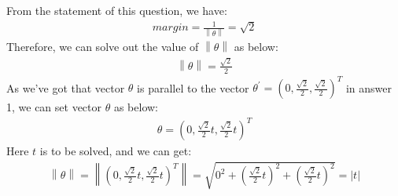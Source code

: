 \documentclass[paper=a4, fontsize=11pt]{scrartcl} %
\numberwithin{equation}{section} %
\numberwithin{figure}{section} %
\numberwithin{table}{section} %
\begin{document}
From the statement of this question, we have:
\begin{align*}
margin=\frac{1}{\left \| \theta  \right \|}=\sqrt{2}
\end{align*}
Therefore, we can solve out the value of $\left \| \theta  \right \|$ as below:
\begin{align*}
\left \| \theta  \right \|=\frac{\sqrt{2}}{2}
\end{align*}
As we've got that vector $\theta$ is parallel to the vector $\theta^{'} = \left(0, \frac{\sqrt{2}}{2}, \frac{\sqrt{2}}{2}\right)^{T}$ in answer 1, we can set vector $\theta$ as below:
\begin{align*}
\theta = \left(0, \frac{\sqrt{2}}{2}t, \frac{\sqrt{2}}{2}t\right)^{T}
\end{align*}
Here $t$ is to be solved, and we can get:
\begin{align*}
\left \| \theta \right \| = \left \| \left(0, \frac{\sqrt{2}}{2}t, \frac{\sqrt{2}}{2}t\right)^{T} \right \|=\sqrt{0^{2}+\left ( \frac{\sqrt{2}}{2}t \right )^{2}+\left ( \frac{\sqrt{2}}{2}t \right )^{2}}=\left | t \right |
\end{align*}
\end{document}
